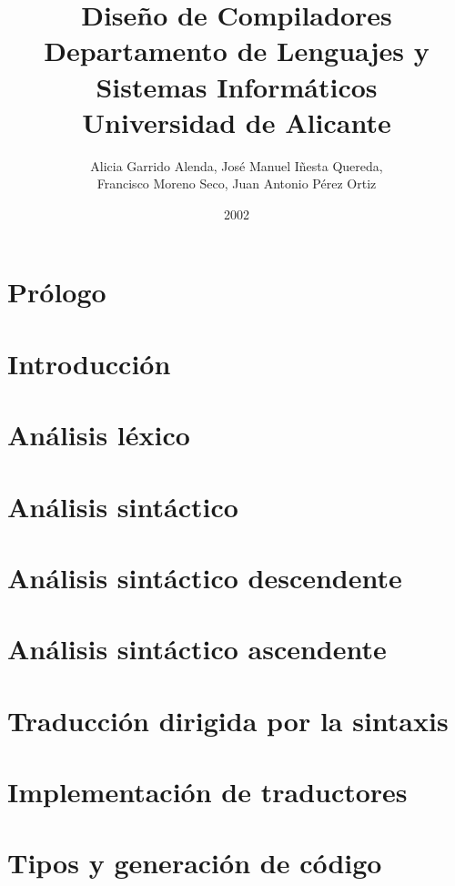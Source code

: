 \documentclass[a4paper,11pt,titlepage]{book}
\title{{\Huge Diseño de Compiladores}\\
       {\large Departamento de Lenguajes y Sistemas Informáticos}\\
       {\large Universidad de Alicante}}
\author{{Alicia Garrido Alenda, José Manuel Iñesta Quereda,} \\
        {Francisco Moreno Seco, Juan Antonio Pérez Ortiz}}
\date{2002}
\newcommand{\echapter}{\newpage\thispagestyle{empty}}
\begin{document}
\frontmatter
\thispagestyle{empty}
\maketitle
\tableofcontents
\echapter

\mainmatter
\chapter*{Prólogo} 

\echapter

\chapter{Introducción}

\echapter

\chapter{Análisis léxico}

\echapter

\chapter{Análisis sintáctico}

\echapter

\chapter{Análisis sintáctico descendente}

\echapter

\chapter{Análisis sintáctico ascendente}

\echapter

\chapter{Traducción dirigida por la sintaxis}

\echapter

\chapter{Implementación de traductores}

\echapter

\chapter{Tipos y generación de código}

\echapter
\end{document}
